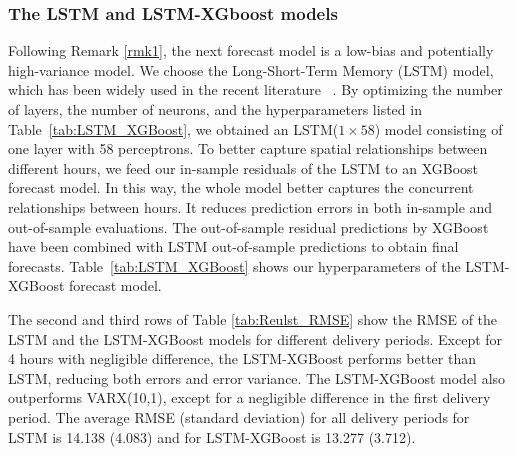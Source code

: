 \documentclass{article}
\begin{document}
\subsubsection{The LSTM and LSTM-XGboost models} 
\label{subsub2}
Following Remark \ref{rmk1}, the next forecast model is a low-bias and potentially high-variance model. We choose the Long-Short-Term Memory (LSTM) model, which has been widely used in the recent literature ~\cite{lehna2022forecasting,lago2021forecasting}. By optimizing the number of layers, the number of neurons, and the hyperparameters listed in Table~\ref{tab:LSTM_XGBoost}, we obtained an LSTM($1\times58$) model consisting of one layer with 58 perceptrons. To better capture spatial relationships between different hours, we feed our in-sample residuals of the LSTM to an XGBoost forecast model. In this way, the whole model better captures the concurrent relationships between hours. It reduces prediction errors in both in-sample and out-of-sample evaluations. The out-of-sample residual predictions by XGBoost have been combined with LSTM out-of-sample predictions to obtain final forecasts. Table~\ref{tab:LSTM_XGBoost} shows our hyperparameters of the LSTM-XGBoost forecast model. 

The second and third rows of Table \ref{tab:Reulst_RMSE} show the RMSE of the LSTM and the LSTM-XGBoost models for different delivery periods. Except for 4 hours with negligible difference, the LSTM-XGBoost performs better than LSTM, reducing both errors and error variance. The LSTM-XGBoost model also outperforms VARX(10,1), except for a negligible difference in the first delivery period. The average RMSE (standard deviation) for all delivery periods for LSTM is 14.138 (4.083) and for LSTM-XGBoost is 13.277 (3.712).
\end{document}
